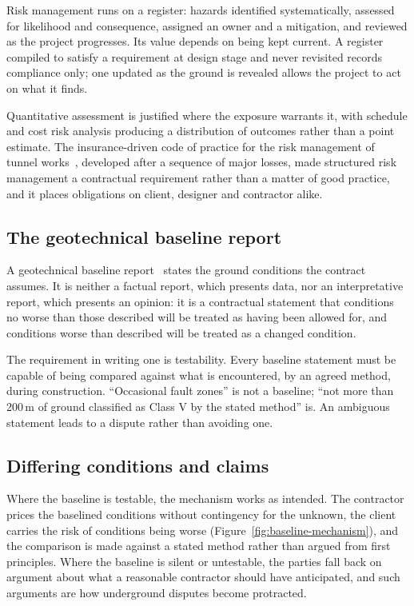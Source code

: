 Risk management runs on a register: hazards identified systematically,
assessed for likelihood and consequence, assigned an owner and a mitigation,
and reviewed as the project progresses. Its value depends on being kept
current. A register compiled to satisfy a requirement at design stage and never
revisited records compliance only; one updated as the ground is revealed
allows the project to act on what it finds.

Quantitative assessment is justified where the exposure warrants it, with
schedule and cost risk analysis producing a distribution of outcomes rather
than a point estimate. The insurance-driven code of practice for the risk
management of tunnel works~\citep{itig2012code}, developed after a sequence of
major losses, made structured risk management a contractual requirement
rather than a matter of good practice, and it places obligations on client,
designer and contractor alike.

\subsection{The geotechnical baseline report}
\label{sec:baseline-report}

A geotechnical baseline report~\citep{essex2007gbr} states the ground
conditions the contract assumes. It is neither a factual report, which presents data, nor an
interpretative report, which presents an opinion: it is a contractual
statement that conditions no worse than those described will be treated as
having been allowed for, and conditions worse than described will be treated
as a changed condition.

The requirement in writing one is testability. Every
baseline statement must be capable of being compared against what is
encountered, by an agreed method, during construction. ``Occasional fault
zones'' is not a baseline; ``not more than 200\,m of ground classified as Class
V by the stated method'' is. An ambiguous statement leads to a dispute
rather than avoiding one.

\subsection{Differing conditions and claims}
\label{sec:differing-conditions}

Where the baseline is testable, the mechanism works as intended. The contractor prices the baselined
conditions without contingency for the unknown, the client carries the risk of
conditions being worse (Figure~\ref{fig:baseline-mechanism}), and the comparison is made against a stated method
rather than argued from first principles. Where the baseline is silent or
untestable, the parties fall back on argument about what a reasonable
contractor should have anticipated, and such arguments are how underground
disputes become protracted.

